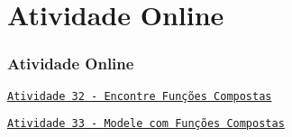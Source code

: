 \section{Atividade Online}
\begin{frame}
\frametitle{Atividade Online} 

\href{https://pt.khanacademy.org/math/algebra2/manipulating-functions/function-composition/e/compose-functions}
{{\tt Atividade 32 - Encontre Funções Compostas}}

\href{https://pt.khanacademy.org/math/algebra2/manipulating-functions/combining-and-composing-modeling-functions/e/modeling-with-composite-functions}
{{\tt Atividade 33 - Modele com Funções Compostas}}



\end{frame}
